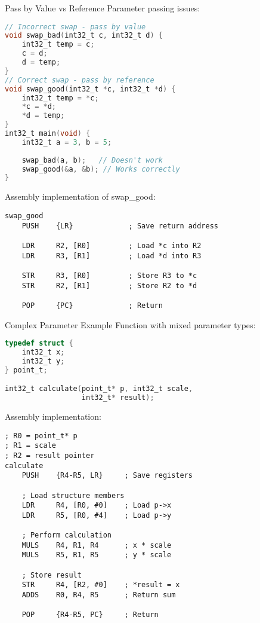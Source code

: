 \begin{example2}{Pass by Value vs Reference} Parameter passing issues:
\begin{lstlisting}[language=C, style=basesmol]
// Incorrect swap - pass by value
void swap_bad(int32_t c, int32_t d) {
    int32_t temp = c;
    c = d;
    d = temp;
}
// Correct swap - pass by reference
void swap_good(int32_t *c, int32_t *d) {
    int32_t temp = *c;
    *c = *d;
    *d = temp;
}
int32_t main(void) {
    int32_t a = 3, b = 5;
    
    swap_bad(a, b);   // Doesn't work
    swap_good(&a, &b); // Works correctly
}
\end{lstlisting}

Assembly implementation of swap\_good:
\begin{lstlisting}[language=armasm, style=basesmol]
swap_good
    PUSH    {LR}             ; Save return address
    
    LDR     R2, [R0]         ; Load *c into R2
    LDR     R3, [R1]         ; Load *d into R3
    
    STR     R3, [R0]         ; Store R3 to *c
    STR     R2, [R1]         ; Store R2 to *d
    
    POP     {PC}             ; Return
\end{lstlisting}
\end{example2}





\begin{example2}{Complex Parameter Example}
Function with mixed parameter types:
\begin{lstlisting}[language=C, style=basesmol]
typedef struct {
    int32_t x;
    int32_t y;
} point_t;

int32_t calculate(point_t* p, int32_t scale, 
                  int32_t* result);
\end{lstlisting}

Assembly implementation:
\begin{lstlisting}[language=armasm, style=basesmol]
; R0 = point_t* p
; R1 = scale
; R2 = result pointer
calculate
    PUSH    {R4-R5, LR}     ; Save registers
    
    ; Load structure members
    LDR     R4, [R0, #0]    ; Load p->x
    LDR     R5, [R0, #4]    ; Load p->y
    
    ; Perform calculation
    MULS    R4, R1, R4      ; x * scale
    MULS    R5, R1, R5      ; y * scale
    
    ; Store result
    STR     R4, [R2, #0]    ; *result = x
    ADDS    R0, R4, R5      ; Return sum
    
    POP     {R4-R5, PC}     ; Return
\end{lstlisting}
\end{example2}



